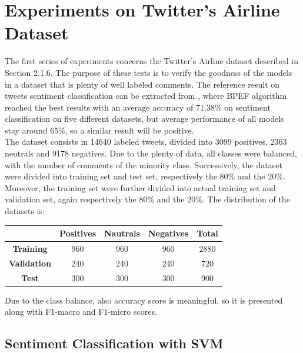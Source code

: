 \section{Experiments on Twitter's Airline Dataset}

The first series of experiments concerns the Twitter's Airline dataset described in Section 2.1.6. The purpose of these tests is to verify the goodness of the models in a dataset that is plenty of well labeled comments. The reference result on tweets sentiment classification can be extracted from \cite{Zimbra:2018:STS:3210372.3185045}, where BPEF algorithm reached the best results with an average accuracy of 71.38\% on sentiment classification on five different datasets, but average performance of all models stay around 65\%, so a similar result will be positive.\\
The dataset consists in 14640 labeled tweets, divided into 3099 positives, 2363 neutrals and 9178 negatives. Due to the plenty of data, all classes were balanced, with the number of comments of the minority class. Successively, the dataset were divided into training set and test set, respectively the 80\% and the 20\%. Moreover, the training set were further divided into actual training set and validation set, again respectively the 80\% and the 20\%. The distribution of the datasets is:

\begin{center}
	\begin{tabular}{ | c  c  c  c | c | } 
		\hline
		& \textbf{Positives} & \textbf{Nautrals} & \textbf{Negatives} & \textbf{Total} \\
		\hline
		\textbf{Training} & 960 & 960 & 960 & 2880 \\ 
		\hline
		\textbf{Validation} & 240 & 240 & 240 & 720 \\ 
		\hline
		\textbf{Test} & 300 & 300 & 300 & 900 \\
		\hline
	\end{tabular}
\end{center}

Due to the class balance, also accuracy score is meaningful, so it is presented along with F1-macro and F1-micro scores.


\subsection{Sentiment Classification with SVM}

